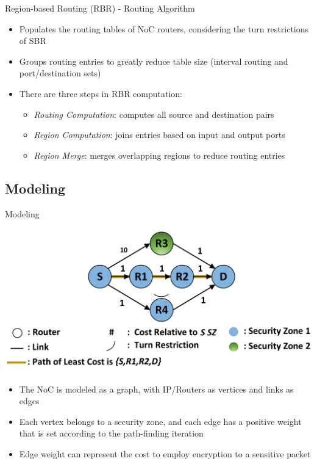 \begin{frame}{Region-based Routing (RBR) - Routing Algorithm}
	\begin{itemize}
		\setlength{\itemsep}{1em}
		\item<1-> Populates the routing tables of NoC routers, considering the turn restrictions of SBR
		
		\item<1-> Groups routing entries to greatly reduce table size (interval routing and port/destination sets)
		
		\item<1-> There are three steps in RBR computation:
		\begin{itemize}[i]
			\setlength{\itemsep}{0.5em}
			\item<1-> \textit{Routing Computation}: computes all source and destination pairs
			
			\item<1-> \textit{Region Computation}: joins entries based on input and output ports
			
			\item<1-> \textit{Region Merge}: merges overlapping regions to reduce routing entries
		\end{itemize}
	\end{itemize}
\end{frame}

\subsection{Modeling}
\begin{frame}[t]{Modeling}
	\begin{center}
		\includegraphics[width=0.75\linewidth]{images/secure_routing/rbr-path-finding.pdf}
	\end{center}
	\begin{itemize}
		\item<only@1> The NoC is modeled as a graph, with IP/Routers as vertices and links as edges
		
		\item<only@2> Each vertex belongs to a security zone, and each edge has a positive weight that is set according to the path-finding iteration
		
		\item<only@3> Edge weight can represent the cost to employ encryption to a sensitive packet
	\end{itemize}
\end{frame}
